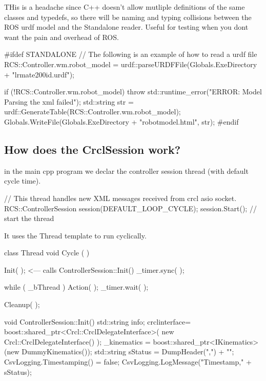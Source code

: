 T\-His is a headache since C++ doesn't allow mutliple definitions of the same classes and typedefs, so there will be naming and typing collisions between the R\-O\-S urdf model and the Standalone reader. Useful for testing when you dont want the pain and overhead of R\-O\-S. \begin{DoxyVerb}#ifdef STANDALONE
        // The following is an example of how to read a urdf file
        RCS::Controller.wm.robot_model = urdf::parseURDFFile(Globals.ExeDirectory + "lrmate200id.urdf");

        if (!RCS::Controller.wm.robot_model) {
            throw std::runtime_error("ERROR: Model Parsing the xml failed");
        }
        std::string str = urdf::GenerateTable(RCS::Controller.wm.robot_model);
        Globals.WriteFile(Globals.ExeDirectory + "robotmodel.html", str);
#endif
\end{DoxyVerb}


\subsection*{How does the Crcl\-Session work? }

in the main cpp program we declar the controller session thread (with default cycle time). \begin{DoxyVerb}// This thread handles new XML messages received from  crcl asio socket.
RCS::ControllerSession session(DEFAULT_LOOP_CYCLE);
session.Start(); // start the thread
\end{DoxyVerb}


It uses the Thread template to run cyclically. \begin{DoxyVerb} class Thread
       void Cycle ( )
        {
            Init( ); <--- calls ControllerSession::Init() 
            _timer.sync( );

            while ( _bThread )
            {
                Action( );
                _timer.wait( );
            }

            Cleanup( );
        }

   void ControllerSession::Init() {
        std::string info;
       crclinterface= boost::shared_ptr<Crcl::CrclDelegateInterface>(
               new Crcl::CrclDelegateInterface() );
        _kinematics =  boost::shared_ptr<IKinematics>(new DummyKinematics());
        std::string sStatus = DumpHeader(",") + "\n";
        CsvLogging.Timestamping() = false;
        CsvLogging.LogMessage("Timestamp," + sStatus);
    }
\end{DoxyVerb}


